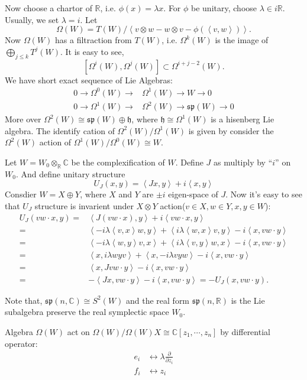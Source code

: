 \documentclass[12pt]{article}
\def\bR{{\mathbb{R}}}
\def\bC{{\mathbb{C}}}
\def\sp{{\mathfrak{sp}}}
\def\inn#1#2{\left\langle{#1},{#2}\right\rangle}
\def\fhh{\mathfrak{h}}
\begin{document}
Now choose a chartor of $\bR$, i.e. $\phi(x) = \lambda x$. 
For $\phi$ be unitary, choose $\lambda \in i\bR$. Usually, we set $\lambda=i$. 
Let
\[
\Omega(W) = T(W) / \left\langle v\otimes w - w\otimes v - \phi(\inn{v}{w})\right\rangle.
\]
Now $\Omega(W)$ has a filtraction from $T(W)$, i.e. 
$\Omega^k(W)$ is the image of $\bigoplus_{j\leq k}T^j(W)$.
It is easy to see, 
\[
[\Omega^i(W),\Omega^j(W)] \subset \Omega^{i+j-2}(W).
\]
We have short exact sequence of Lie Algebras:
\begin{align}
0\to \Omega^0(W) \to &\Omega^1(W) \to W \to 0\\
0\to \Omega^1(W) \to &\Omega^2(W) \to \sp(W)\to 0 
\end{align}
More over $\Omega^2(W) \cong \sp(W) \oplus \fhh$, 
where $\fhh\cong \Omega^1(W)$ is a hisenberg Lie algebra.
The identify cation of $\Omega^2(W)/\Omega^1(W)$ is given by
consider the $\Omega^2(W)$ action of $\Omega^1(W)/\Omega^0(W)\cong W$. 

Let $W=W_0\otimes_\bR\bC$ be the complexification of $W$. 
Define $J$ as multiply by ``$i$'' on $W_0$. And define unitary structure
\[
U_J(x,y) = \inn{Jx}{y} + i\inn{x}{y}
\]
Consdier $W = X\oplus Y$, where $X$ and $Y$ are $\pm i$ eigen-space of $J$. 
Now it's easy to see that $U_J$ structure is 
invarient under $X\otimes Y$ action($v\in X, w\in Y, x,y\in W$):
\[
\begin{split}
U_J(vw\cdot x,y) =& \inn{J(vw\cdot x)}{y} + i\inn{vw\cdot x}{y}\\
=&\inn{-i\lambda\inn{v}{x} w}{y}
+\inn{i\lambda\inn{w}{x} v}{y}
 - i \inn{x}{vw\cdot y}\\
=& \inn{-i\lambda\inn{w}{y}v}{x}
+ \inn{i\lambda \inn{v}{y}w}{x}
-i\inn{x}{vw\cdot y}\\
=& \inn{x}{i\lambda{w}{y}v}
+ \inn{x}{-i\lambda{v}{y}w}
-i\inn{x}{vw\cdot y}\\
=& \inn{x}{J vw\cdot y} -i\inn{x}{vw\cdot y}\\
=& -\inn{Jx}{vw\cdot y}  -i\inn{x}{vw\cdot y}= -U_J(x,vw\cdot y).
\end{split}
\]

Note that, $\sp(n,\bC)\cong S^2(W)$ and the real form $\sp(n,\bR)$ is the 
Lie subalgebra preserve the real symplectic space $W_0$. 



Algebra $\Omega(W)$ act on $\Omega(W)/\Omega(W)X \cong \bC[z_1, \cdots,z_n]$ by differential operator:
\begin{align*}
e_i &\leftrightarrow \lambda \frac{\partial}{\partial z_i}\\
f_i &\leftrightarrow z_i\\
\end{align*}
\end{document}
